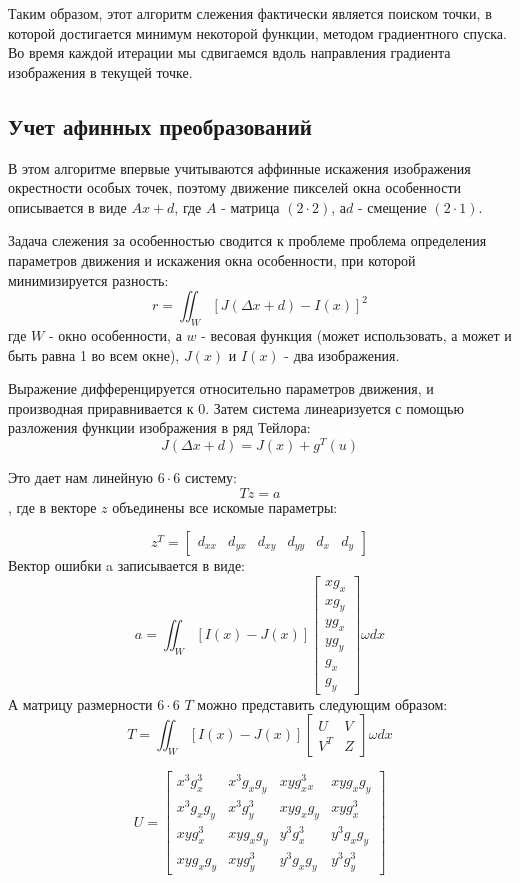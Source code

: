 Таким образом, этот алгоритм слежения фактически является поиском точки, в которой достигается минимум некоторой функции, методом градиентного спуска. Во время каждой итерации мы сдвигаемся вдоль направления градиента изображения в текущей точке.

\subsection{Учет афинных преобразований}

В этом алгоритме впервые учитываются аффинные искажения изображения окрестности особых точек, поэтому движение пикселей окна особенности описывается в виде $Ax + d$, где $A$ - матрица $(2 \cdot 2)$, $а d$ - смещение $(2 \cdot 1)$.

Задача слежения за особенностью сводится к проблеме проблема определения параметров движения и искажения окна особенности, при которой минимизируется разность:
$$r=\iint_W [J(\Delta x+d)-I(x)]^2$$
где $W$ - окно особенности, а $w$ - весовая функция (может использовать, а может и быть равна 1 во всем окне), $J(x)$ и $I(x)$ - два изображения.

Выражение дифференцируется относительно параметров движения, и производная приравнивается к 0. Затем система линеаризуется с помощью разложения функции изображения в ряд Тейлора:
$$J(\Delta x+d)= J(x)+g^T(u)$$

Это дает нам линейную $6 \cdot 6$ систему:
$$Tz=a$$
, где в векторе $z$ объединены все искомые параметры:

$$z^T=\begin{bmatrix}
 d_{xx} & d_{yx} & d_{xy} & d_{yy} & d_x & d_y
\end{bmatrix}$$
Вектор ошибки a записывается в виде:
$$a=\iint_W [I(x)-J(x)]\begin{bmatrix}
xg_x\\
xg_y\\
yg_x\\
yg_y\\
g_x\\
g_y
\end{bmatrix}\omega dx$$
А матрицу размерности $6 \cdot 6$ $T$ можно представить следующим образом:
$$T=\iint_W [I(x)-J(x)]\begin{bmatrix}
U & V\\
V^T & Z
\end{bmatrix}\omega dx$$

$$U=\begin{bmatrix}
x^3 g^3_x & x^3 g_x g_y & x y g^3_x_x & x y g_x g_y \\
x^3g_xg_y & x^3g^3_y & xyg_xg_y & xyg^3_x \\
xyg^3_x & xyg_xg_y & y^3g^3_x & y^3g_xg_y \\
xyg_xg_y & xyg^3_y & y^3g_xg_y & y^3g^3_y
\end{bmatrix}$$

